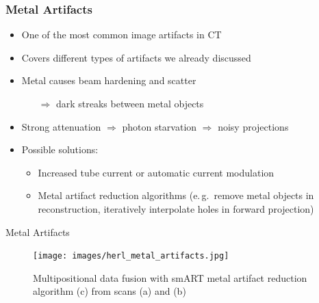 \begin{frame}
	\frametitle{Metal Artifacts}


	\begin{itemize}
		\setlength\itemsep{0.3cm}
		\item One of the most common image artifacts in CT
		\item Covers different types of artifacts we already discussed
		\item Metal causes beam hardening and scatter
		      \begin{itemize}
			      \item[$\Rightarrow$] dark streaks between metal objects
		      \end{itemize}
		\item Strong attenuation $\Rightarrow$ photon starvation $\Rightarrow$ noisy projections

		\item Possible solutions:
		      \begin{itemize}
			      \item Increased tube current or automatic current modulation
			      \item Metal artifact reduction algorithms (e.\,g.~remove metal objects in reconstruction, iteratively interpolate holes in forward projection)
		      \end{itemize}

	\end{itemize}
\end{frame}

\begin{frame}[c]{Metal Artifacts}
	\begin{figure}[tbp]
		\centering
		\texttt{[image: images/herl\_metal\_artifacts.jpg]}
		\caption{Multipositional data fusion with smART metal artifact reduction algorithm (c) from scans (a) and (b)}%
		\label{fig:metal_arifatc_reduction}
	\end{figure}

	\flushright{}
	\tiny

\end{frame}

